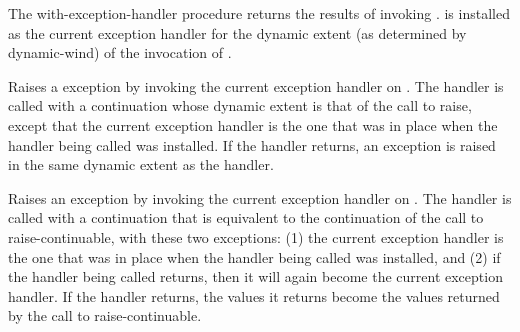 \begin{entry}{%
}

  The {\cf
with-exception-handler} procedure returns the results of invoking
.   is installed as the current
exception handler for the dynamic extent (as determined by {\cf
  dynamic-wind}) of the invocation of .


\end{entry}

\begin{entry}{%
}

Raises a exception by invoking the current exception
handler on . The handler is called with a continuation whose
dynamic extent is that of the call to {\cf raise}, except that
the current exception handler is the one that was in place when the
handler being called was installed.  If the handler returns, an
exception is raised in the same dynamic extent as the handler.
\end{entry}

\begin{entry}{%
}

Raises an exception by invoking the current
exception handler on . The handler is called with a
continuation that is equivalent to the continuation of the call to
{\cf raise-continuable}, with these two exceptions: (1) the current
exception handler is the one that was in place when the handler being
called was installed, and (2) if the handler being called returns,
then it will again become the current exception handler.  If the
handler returns, the values it returns become the values returned by
the call to {\cf raise-continuable}.
\end{entry}

